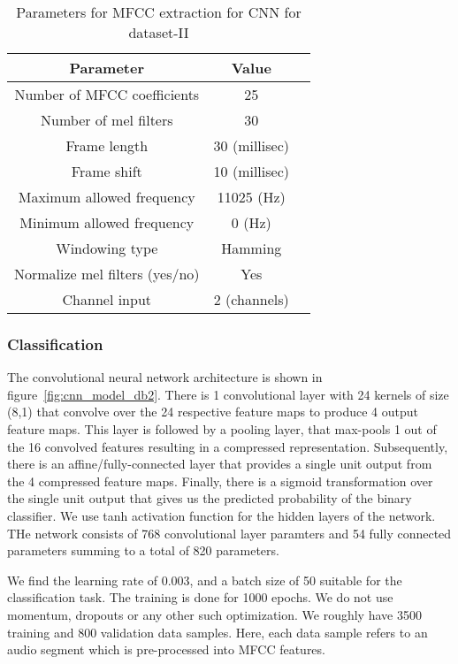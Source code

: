 \begin{table}[tb]
\caption[Parameters for MFCC extraction for CNN for dataset-II]{Parameters for MFCC extraction for CNN  for dataset-II}
\label{tab:param_mfcc_cnn_db2}
\centering
\begin{tabular}{ccc}
\toprule
Parameter & Value \\
\midrule
Number of MFCC coefficients	& 25\\
Number of mel filters	& 30\\
Frame length & 30 (millisec)\\
Frame shift 	& 10 (millisec)\\
Maximum allowed frequency & 11025 (Hz)\\
Minimum allowed frequency & 0 (Hz)\\
Windowing type & Hamming\\
Normalize mel filters (yes/no) & Yes \\
Channel input & 2 (channels) \\
\bottomrule 
\end{tabular}
\end{table}

\subsubsection{Classification}
The convolutional neural network architecture is shown in figure~\ref{fig:cnn_model_db2}. There is 1 convolutional layer with 24 kernels of size (8,1) that convolve over the 24 respective feature maps to produce 4 output feature maps. This layer is followed by a pooling layer, that max-pools 1 out of the 16 convolved features resulting in a compressed representation. Subsequently, there is an affine/fully-connected layer that provides a single unit output from the 4 compressed feature maps. Finally, there is a sigmoid transformation over the single unit output that gives us the predicted probability of the binary classifier. We use tanh activation function for the hidden layers of the network. THe network consists of 768 convolutional layer paramters and 54 fully connected parameters summing to a total of 820 parameters.

We find the learning rate of 0.003, and a batch size of 50 suitable for the classification task. The training is done for 1000 epochs. We do not use momentum, dropouts or any other such optimization. We roughly have 3500 training and 800 validation data samples. Here, each data sample refers to an audio segment which is pre-processed into MFCC features.

